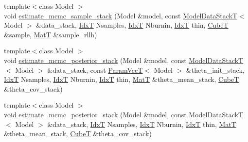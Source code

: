 \begin{DoxyCompactItemize}
\item 
{\footnotesize template$<$class Model $>$ }\\void \hyperlink{namespacemappel_1_1methods_1_1openmp_af5cc14bf072377f8b6411ea79356b8e5}{estimate\+\_\+mcmc\+\_\+sample\+\_\+stack} (Model \&model, const \hyperlink{namespacemappel_aaeb6665bc57476dd93c2df6ad8bc4768}{Model\+Data\+StackT}$<$ Model $>$ \&data\+\_\+stack, \hyperlink{namespacemappel_ab17ec0f30b61ece292439d7ece81d3a8}{IdxT} Nsamples, \hyperlink{namespacemappel_ab17ec0f30b61ece292439d7ece81d3a8}{IdxT} Nburnin, \hyperlink{namespacemappel_ab17ec0f30b61ece292439d7ece81d3a8}{IdxT} thin, \hyperlink{namespacemappel_ab2afab4e6c8805e83946670d882768c2}{CubeT} \&sample, \hyperlink{namespacemappel_a7091ab87c528041f7e2027195fad8915}{MatT} \&sample\+\_\+rllh)
\item 
{\footnotesize template$<$class Model $>$ }\\void \hyperlink{namespacemappel_1_1methods_1_1openmp_a29a123586d125b8d00613119017f9d7b}{estimate\+\_\+mcmc\+\_\+posterior\+\_\+stack} (Model \&model, const \hyperlink{namespacemappel_aaeb6665bc57476dd93c2df6ad8bc4768}{Model\+Data\+StackT}$<$ Model $>$ \&data\+\_\+stack, const \hyperlink{namespacemappel_a0f86d3153e4e27b095012f140eea58de}{Param\+VecT}$<$ Model $>$ \&theta\+\_\+init\+\_\+stack, \hyperlink{namespacemappel_ab17ec0f30b61ece292439d7ece81d3a8}{IdxT} Nsamples, \hyperlink{namespacemappel_ab17ec0f30b61ece292439d7ece81d3a8}{IdxT} Nburnin, \hyperlink{namespacemappel_ab17ec0f30b61ece292439d7ece81d3a8}{IdxT} thin, \hyperlink{namespacemappel_a7091ab87c528041f7e2027195fad8915}{MatT} \&theta\+\_\+mean\+\_\+stack, \hyperlink{namespacemappel_ab2afab4e6c8805e83946670d882768c2}{CubeT} \&theta\+\_\+cov\+\_\+stack)
\item 
{\footnotesize template$<$class Model $>$ }\\void \hyperlink{namespacemappel_1_1methods_1_1openmp_afb909fac9a2058cf1d6c0e61d531b809}{estimate\+\_\+mcmc\+\_\+posterior\+\_\+stack} (Model \&model, const \hyperlink{namespacemappel_aaeb6665bc57476dd93c2df6ad8bc4768}{Model\+Data\+StackT}$<$ Model $>$ \&data\+\_\+stack, \hyperlink{namespacemappel_ab17ec0f30b61ece292439d7ece81d3a8}{IdxT} Nsamples, \hyperlink{namespacemappel_ab17ec0f30b61ece292439d7ece81d3a8}{IdxT} Nburnin, \hyperlink{namespacemappel_ab17ec0f30b61ece292439d7ece81d3a8}{IdxT} thin, \hyperlink{namespacemappel_a7091ab87c528041f7e2027195fad8915}{MatT} \&theta\+\_\+mean\+\_\+stack, \hyperlink{namespacemappel_ab2afab4e6c8805e83946670d882768c2}{CubeT} \&theta\+\_\+cov\+\_\+stack)
\item 

\end{DoxyCompactItemize}
